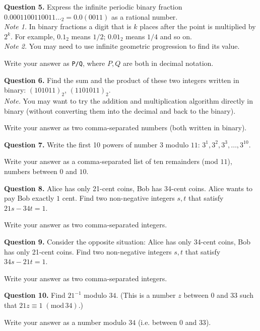\documentclass[jou]{apa6}
\begin{document}
\vspace{6pt}
{\bf Question 5.}
Express the infinite periodic binary fraction $0.0001100110011\ldots_2 = 0.0(0011)$ as a rational number.\\
{\em Note 1.} In binary fractions a digit that is $k$ places after the point is multiplied by $2^k$. 
For example, $0.1_2$ means $1/2$; $0.01_2$ means $1/4$ and so on.\\
{\em Note 2.} You may need to use infinite geometric progression to find its value.

Write your answer as {\tt P/Q}, where $P,Q$ are both in decimal notation. 


\vspace{6pt}
{\bf Question 6.} Find the sum and the product of these two integers written in binary: 
$(101011)_2$, $(1101011)_2$.\\
{\em Note.} You may want to try the addition and multiplication algorithm directly in 
binary (without converting them into the decimal and back to the binary).

Write your answer as two comma-separated numbers (both written in binary). 


\vspace{6pt}
{\bf Question 7.} Write the first 10 powers of number $3$ modulo $11$: $3^1,3^2,3^3,\ldots,3^{10}$. 

Write your answer as a comma-separated list of ten remainders (mod $11$), \textendash{} numbers between $0$ and $10$.


\vspace{6pt}
{\bf Question 8.} Alice has only 21-cent coins, 
Bob has 34-cent coins. Alice wants to pay Bob exactly $1$ cent. 
Find two non-negative integers $s,t$ that satisfy $21s - 34t = 1$. 

Write your answer as two comma-separated integers. 

\vspace{6pt}
{\bf Question 9.} Consider the opposite situation: Alice has only 34-cent coins, 
Bob has only 21-cent coins. Find two non-negative integers 
$s,t$ that satisfy $34s - 21t = 1$. 

Write your answer as two comma-separated integers. 

\vspace{6pt}
{\bf Question 10.} Find $21^{-1}$ modulo $34$. (This is a number $z$ between $0$ and $33$ such that
$21z \equiv 1\;(\text{mod}\,34)$.)

Write your answer as a number modulo $34$ (i.e. between $0$ and $33$). 
\end{document}
